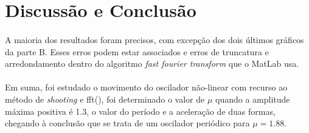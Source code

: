 \documentclass[a4paper, 11pt]{article}
\newcommand{\fft}{{\fontfamily{pcr}\selectfont fft()}}
\newcommand{\m}{$\mu$ }
\newcommand{\shooting}{\textit{shooting} }
\begin{document}
	\section{Discussão e Conclusão}
	\paragraph{}
	A maioria dos resultados foram precisos, com excepção dos dois últimos gráficos da parte B. Esses erros podem estar associados e erros de truncatura e arredondamento dentro do algoritmo \textit{fast fourier transform} que o MatLab usa.
	\paragraph{}
	Em suma, foi estudado o movimento do oscilador não-linear com recurso ao método de \shooting e \fft, foi determinado o valor de \m quando a amplitude máxima positiva é 1.3, o valor do período e a aceleração de duas formas, chegando à conclusão que se trata de um oscilador periódico para $\mu=1.88$.
	
	
	
	
	
	
	
	
\end{document}

